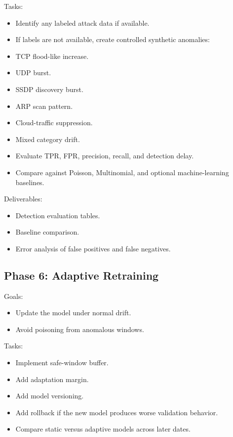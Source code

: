 \documentclass[11pt,a4paper]{article}
\begin{document}
Tasks:

\begin{itemize}
  \item Identify any labeled attack data if available.
  \item If labels are not available, create controlled synthetic anomalies:
\end{itemize}

\begin{itemize}
  \item TCP flood-like increase.
  \item UDP burst.
  \item SSDP discovery burst.
  \item ARP scan pattern.
  \item Cloud-traffic suppression.
  \item Mixed category drift.
\end{itemize}

\begin{itemize}
  \item Evaluate TPR, FPR, precision, recall, and detection delay.
  \item Compare against Poisson, Multinomial, and optional machine-learning baselines.
\end{itemize}

Deliverables:

\begin{itemize}
  \item Detection evaluation tables.
  \item Baseline comparison.
  \item Error analysis of false positives and false negatives.
\end{itemize}

\subsection{Phase 6: Adaptive Retraining}

Goals:

\begin{itemize}
  \item Update the model under normal drift.
  \item Avoid poisoning from anomalous windows.
\end{itemize}

Tasks:

\begin{itemize}
  \item Implement safe-window buffer.
  \item Add adaptation margin.
  \item Add model versioning.
  \item Add rollback if the new model produces worse validation behavior.
  \item Compare static versus adaptive models across later dates.
\end{itemize}
\end{document}
